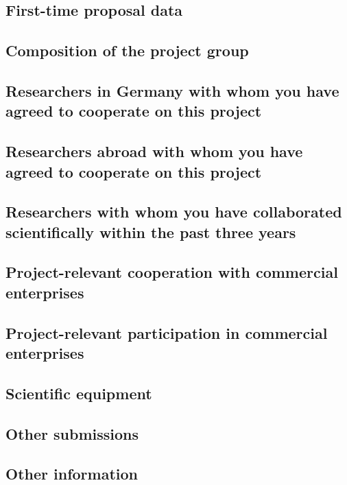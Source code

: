 \documentclass{scrartcl}
\begin{document}
\subsection{First-time proposal data}

\subsection{Composition of the project group}

\subsection{Researchers in Germany with whom you have agreed to cooperate on this project}

\subsection{Researchers abroad with whom you have agreed to cooperate on this project}

\subsection{Researchers with whom you have collaborated scientifically within the past three years}

\subsection{Project-relevant cooperation with commercial enterprises}

\subsection{Project-relevant participation in commercial enterprises}

\subsection{Scientific equipment}

\subsection{Other submissions}

\subsection{Other information}
\end{document}

